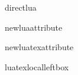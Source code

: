 %
%
%



\newif\ifgreluatex
\expandafter\ifx\csname directlua\endcsname\relax
  \greluatexfalse
\else
  \greluatextrue
\fi


\ifgreluatex\else
  \expandafter\ifx\csname localrightbox\endcsname\relax
    \errmessage{Error: this document must be compiled with Aleph (lamed) or LuaTeX (lualatex)}
  \fi
\fi

\newif\ifgreluatextra
\expandafter\ifx\csname newluaattribute\endcsname\relax
  \greluatextrafalse
\else
  \ifgreluatex
    \greluatextratrue
  \else
    \greluatextrafalse
  \fi
\fi

\newif\ifgreluatextranew
\expandafter\ifx\csname newluatexattribute\endcsname\relax
  \greluatextranewfalse
\else
  \ifgreluatex
    \greluatextranewtrue
  \else
    \greluatextranewfalse
  \fi
\fi

\newif\ifgreluatexnew
\expandafter\ifx\csname luatexlocalleftbox\endcsname\relax
  \let\grelocalleftbox\localleftbox
  \let\grelocalrightbox\localrightbox
  \greluatexnewfalse
\else
  \let\grelocalleftbox\luatexlocalleftbox
  \let\grelocalrightbox\luatexlocalrightbox
  \greluatexnewtrue
\fi

